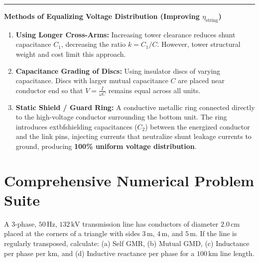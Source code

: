 \documentclass[11pt,a4paper]{article}
\newcommand{\concept}[1]{%
  \vspace{3pt}\noindent\textcolor{AnthGreen}{\rule{3.5pt}{10pt}}\enspace
  \textbf{\sffamily\color{AnthDark}#1}\par\vspace{2pt}%
}
\newenvironment{Problem}[1][Numerical Problem]{\begin{tcolorbox}[problembox, title=#1]}{\end{tcolorbox}}
\begin{document}
\concept{Methods of Equalizing Voltage Distribution (Improving $\eta_{\text{string}}$)}
\begin{enumerate}
  \item \textbf{Using Longer Cross-Arms:} Increasing tower clearance reduces shunt capacitance $C_1$, decreasing the ratio $k = C_1 / C$. However, tower structural weight and cost limit this approach.
  \item \textbf{Capacitance Grading of Discs:} Using insulator discs of varying capacitance. Discs with larger mutual capacitance $C$ are placed near conductor end so that $V = \frac{I}{\omega C}$ remains equal across all units.
  \item \textbf{Static Shield / Guard Ring:} A conductive metallic ring connected directly to the high-voltage conductor surrounding the bottom unit. The ring introduces 	extbf{shielding capacitances ($C_2$)} between the energized conductor and the link pins, injecting currents that neutralize shunt leakage currents to ground, producing \textbf{100\% uniform voltage distribution}.
\end{enumerate}

\clearpage
\section{Comprehensive Numerical Problem Suite}

\begin{Problem}[Problem 1: Inductance of a Symmetrically Transposed 3-$\Phi$ Single Circuit Line]
A $3$-phase, $50\,\text{Hz}$, $132\,\text{kV}$ transmission line has conductors of diameter $2.0\,\text{cm}$ placed at the corners of a triangle with sides $3\,\text{m}$, $4\,\text{m}$, and $5\,\text{m}$. If the line is regularly transposed, calculate: (a) Self GMR, (b) Mutual GMD, (c) Inductance per phase per km, and (d) Inductive reactance per phase for a $100\,\text{km}$ line length.
\end{Problem}
\end{document}
